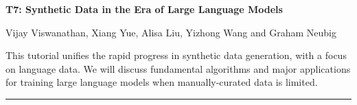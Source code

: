 \begin{center}
    \Large{\textbf{T7: Synthetic Data in the Era of Large Language Models}\\}
    \par\bigskip
    \large{Vijay Viswanathan, Xiang Yue, Alisa Liu, Yizhong Wang and Graham Neubig}\\
    \par\bigskip

\end{center}

This tutorial unifies the rapid progress in synthetic data generation, with a focus on language data. 
We will discuss fundamental algorithms and major applications for training large language models when manually-curated data is limited.

\begin{center}
    \noindent\rule{200px}{1pt}
\end{center}
